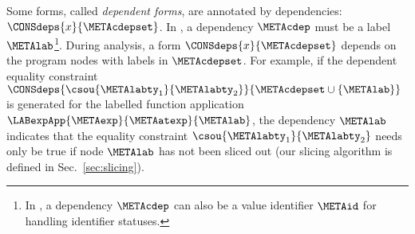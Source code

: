 \documentclass{jfp1}
\begin{document}
Some forms, called
%
%
%
\emph{dependent forms}, are annotated by
dependencies: $\CONSdeps{x}{\METAcdepset}$.  In \CORETES, a dependency
$\METAcdep$ must be a label $\METAlab$\footnote{In \IMPLTES, a
  dependency $\METAcdep$
  can also be a value identifier $\METAid$ for handling identifier
  statuses.}.
%
%
During analysis, a form $\CONSdeps{x}{\METAcdepset}$ depends on the
program nodes with labels in $\METAcdepset$.
%
For example, if the dependent equality constraint
$\CONSdeps{\csou{\METAlabty_1}{\METAlabty_2}}{\METAcdepset\cup\{\METAlab\}}$
is generated for the labelled function application
$\LABexpApp{\METAexp}{\METAatexp}{\METAlab}$, the dependency
$\METAlab$ indicates that the
equality constraint $\csou{\METAlabty_1}{\METAlabty_2}$ needs only be
true if node $\METAlab$ has not been sliced out (our slicing algorithm
is defined in Sec.~\ref{sec:slicing}).
%
%

\end{document}
